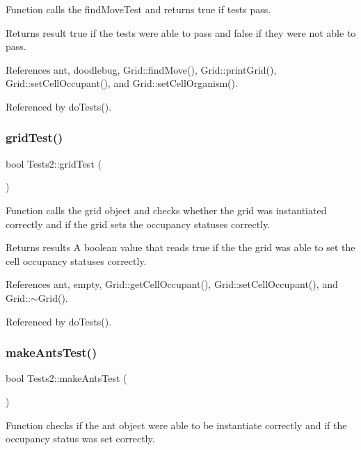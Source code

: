 Function calls the find\+Move\+Test and returns true if tests pass.

\begin{DoxyReturn}{Returns}
result true if the tests were able to pass and false if they were not able to pass. 
\end{DoxyReturn}


References ant, doodlebug, Grid\+::find\+Move(), Grid\+::print\+Grid(), Grid\+::set\+Cell\+Occupant(), and Grid\+::set\+Cell\+Organism().



Referenced by do\+Tests().

\mbox{\label{classTests2_afe90de3a79c4105e63205cb8f019bbb2}} 
\subsubsection{grid\+Test()}
{\footnotesize\ttfamily bool Tests2\+::grid\+Test (\begin{DoxyParamCaption}{ }\end{DoxyParamCaption})}

Function calls the grid object and checks whether the grid was instantiated correctly and if the grid sets the occupancy statuses correctly.

\begin{DoxyReturn}{Returns}
results A boolean value that reads true if the the grid was able to set the cell occupancy statuses correctly. 
\end{DoxyReturn}


References ant, empty, Grid\+::get\+Cell\+Occupant(), Grid\+::set\+Cell\+Occupant(), and Grid\+::$\sim$\+Grid().



Referenced by do\+Tests().

\mbox{\label{classTests2_aa4d40396194cf770aa82dc11b449ea62}} 
\subsubsection{make\+Ants\+Test()}
{\footnotesize\ttfamily bool Tests2\+::make\+Ants\+Test (\begin{DoxyParamCaption}{ }\end{DoxyParamCaption})}

Function checks if the ant object were able to be instantiate correctly and if the occupancy status was set correctly.

